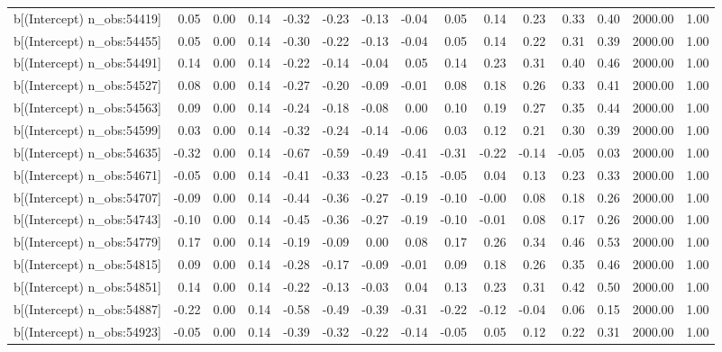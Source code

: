 \begin{table}[ht]
\begin{tabular}{rrrrrrrrrrrrrrr}
  b[(Intercept) n\_obs:54419] & 0.05 & 0.00 & 0.14 & -0.32 & -0.23 & -0.13 & -0.04 & 0.05 & 0.14 & 0.23 & 0.33 & 0.40 & 2000.00 & 1.00 \\ 
  b[(Intercept) n\_obs:54455] & 0.05 & 0.00 & 0.14 & -0.30 & -0.22 & -0.13 & -0.04 & 0.05 & 0.14 & 0.22 & 0.31 & 0.39 & 2000.00 & 1.00 \\ 
  b[(Intercept) n\_obs:54491] & 0.14 & 0.00 & 0.14 & -0.22 & -0.14 & -0.04 & 0.05 & 0.14 & 0.23 & 0.31 & 0.40 & 0.46 & 2000.00 & 1.00 \\ 
  b[(Intercept) n\_obs:54527] & 0.08 & 0.00 & 0.14 & -0.27 & -0.20 & -0.09 & -0.01 & 0.08 & 0.18 & 0.26 & 0.33 & 0.41 & 2000.00 & 1.00 \\ 
  b[(Intercept) n\_obs:54563] & 0.09 & 0.00 & 0.14 & -0.24 & -0.18 & -0.08 & 0.00 & 0.10 & 0.19 & 0.27 & 0.35 & 0.44 & 2000.00 & 1.00 \\ 
  b[(Intercept) n\_obs:54599] & 0.03 & 0.00 & 0.14 & -0.32 & -0.24 & -0.14 & -0.06 & 0.03 & 0.12 & 0.21 & 0.30 & 0.39 & 2000.00 & 1.00 \\ 
  b[(Intercept) n\_obs:54635] & -0.32 & 0.00 & 0.14 & -0.67 & -0.59 & -0.49 & -0.41 & -0.31 & -0.22 & -0.14 & -0.05 & 0.03 & 2000.00 & 1.00 \\ 
  b[(Intercept) n\_obs:54671] & -0.05 & 0.00 & 0.14 & -0.41 & -0.33 & -0.23 & -0.15 & -0.05 & 0.04 & 0.13 & 0.23 & 0.33 & 2000.00 & 1.00 \\ 
  b[(Intercept) n\_obs:54707] & -0.09 & 0.00 & 0.14 & -0.44 & -0.36 & -0.27 & -0.19 & -0.10 & -0.00 & 0.08 & 0.18 & 0.26 & 2000.00 & 1.00 \\ 
  b[(Intercept) n\_obs:54743] & -0.10 & 0.00 & 0.14 & -0.45 & -0.36 & -0.27 & -0.19 & -0.10 & -0.01 & 0.08 & 0.17 & 0.26 & 2000.00 & 1.00 \\ 
  b[(Intercept) n\_obs:54779] & 0.17 & 0.00 & 0.14 & -0.19 & -0.09 & 0.00 & 0.08 & 0.17 & 0.26 & 0.34 & 0.46 & 0.53 & 2000.00 & 1.00 \\ 
  b[(Intercept) n\_obs:54815] & 0.09 & 0.00 & 0.14 & -0.28 & -0.17 & -0.09 & -0.01 & 0.09 & 0.18 & 0.26 & 0.35 & 0.46 & 2000.00 & 1.00 \\ 
  b[(Intercept) n\_obs:54851] & 0.14 & 0.00 & 0.14 & -0.22 & -0.13 & -0.03 & 0.04 & 0.13 & 0.23 & 0.31 & 0.42 & 0.50 & 2000.00 & 1.00 \\ 
  b[(Intercept) n\_obs:54887] & -0.22 & 0.00 & 0.14 & -0.58 & -0.49 & -0.39 & -0.31 & -0.22 & -0.12 & -0.04 & 0.06 & 0.15 & 2000.00 & 1.00 \\ 
  b[(Intercept) n\_obs:54923] & -0.05 & 0.00 & 0.14 & -0.39 & -0.32 & -0.22 & -0.14 & -0.05 & 0.05 & 0.12 & 0.22 & 0.31 & 2000.00 & 1.00 \\ 

\end{tabular}
\end{table}
